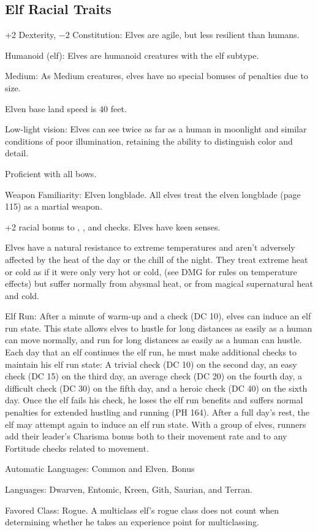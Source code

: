 \subsection{Elf Racial Traits}
\begin{itemize*}
    \item +2 Dexterity, $-2$ Constitution: Elves are agile, but less resilient than humans.
    \item Humanoid (elf): Elves are humanoid creatures with the elf subtype.
    \item Medium: As Medium creatures, elves have no special bonuses of penalties due to size.
    \item Elven base land speed is 40 feet.
    \item Low-light vision: Elves can see twice as far as a human in moonlight and similar conditions of poor illumination, retaining the ability to distinguish color and detail.
    \item Proficient with all bows.
    \item Weapon Familiarity: Elven longblade. All elves treat the elven longblade (page 115) as a martial weapon.
    \item +2 racial bonus to , ,  and  checks. Elves have keen senses.
    \item Elves have a natural resistance to extreme temperatures and aren't adversely affected by the heat of the day or the chill of the night. They treat extreme heat or cold as if it were only very hot or cold, (see DMG for rules on temperature effects) but suffer normally from abysmal heat, or from magical supernatural heat and cold.
    \item Elf Run: After a minute of warm-up and a  check (DC 10), elves can induce an elf run state. This state allows elves to hustle for long distances as easily as a human can move normally, and run for long distances as easily as a human can hustle. Each day that an elf continues the elf run, he must make additional  checks to maintain his elf run state: A trivial check (DC 10) on the second day, an easy check (DC 15) on the third day, an average check (DC 20) on the fourth day, a difficult check (DC 30) on the fifth day, and a heroic check (DC 40) on the sixth day. Once the elf fails his  check, he loses the elf run benefits and suffers normal penalties for extended hustling and running (PH 164). After a full day's rest, the elf may attempt again to induce an elf run state. With a group of elves, runners add their leader's Charisma bonus both to their movement rate and to any Fortitude checks related to movement.
    \item Automatic Languages: Common and Elven. Bonus
    \item Languages: Dwarven, Entomic, Kreen, Gith, Saurian, and Terran.
    \item Favored Class: Rogue. A multiclass elf's rogue class does not count when determining whether he takes an experience point for multiclassing.
\end{itemize*}